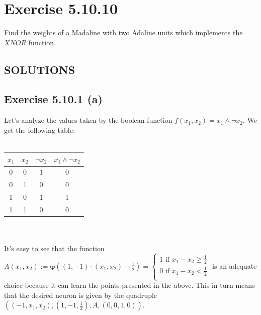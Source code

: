 \documentclass{exam}
\begin{document}
\section*{Exercise 5.10.10}
Find the weights of a Madaline with two Adaline units which implements the $XNOR$ function.\\
\begin{center}    
    \section*{SOLUTIONS}
\end{center}
\subsection*{Exercise 5.10.1 (a)}
Let's analyze the values taken by the boolean function $f(x_1, x_2) = x_{1} \land \neg x_{2}$. We get the following table:\\
\\
\begin{tabular}{|c c c c|}
    \hline
    $x_1$ & $x_2$ & $\neg x_2$ & $x_{1}\land \neg x_{2}$ \\ [0.5ex]
    \hline
    0     & 0     & 1      & 0 \\
    \hline
    0     & 1     & 0      & 0 \\
    \hline
    1     & 0     & 1      & 1 \\
    \hline
    1     & 1     & 0      & 0 \\
    \hline
\end{tabular}\\
\\
It's easy to see that the function $A(x_1, x_2) := \mathbf{\varphi}((1,-1)\cdot(x_1, x_2) -\frac{1}{2}) = \begin{cases}
1 \text{ if } x_1 - x_2 \geq \frac{1}{2} \\ 0 \text{ if } x_1 - x_2 < \frac{1}{2}\\
\end{cases}$ is an adequate choice because it can learn the 
points presented in the above. This in turn means that the desired neuron is given by the quadruple
$((-1,x_1,x_2),(1,-1,\frac{1}{2}),A,(0,0,1,0))$.
\end{document}
